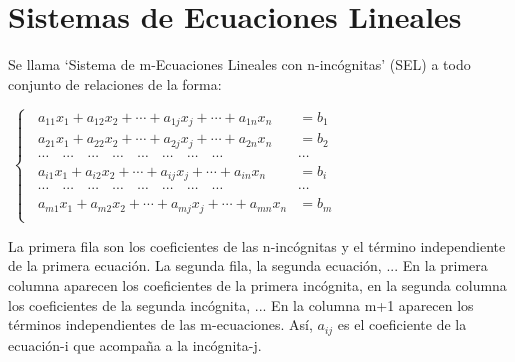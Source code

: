 \section[Sistemas de Ecuaciones Lineales]{Sistemas de Ecuaciones Lineales}

\begin{defi}
Se llama `Sistema de m-Ecuaciones Lineales con n-incógnitas' (SEL) a todo conjunto de relaciones de la forma:

\vspace{4mm}

\centerline{$\boxed{\; \begin{cases}
\;\; a_{11} x_1 + a_{12} x_2 + \cdots + a_{1j} x_j+ \cdots + a_{1n} x_n & = b_1\; \\
\;\; a_{21} x_1 + a_{22} x_2 + \cdots + a_{2j} x_j+ \cdots + a_{2n} x_n & = b_2\; \\
\;\; \cdots \quad \cdots \quad \cdots 	\quad \cdots \quad \cdots \quad \cdots \quad \cdots \quad \cdots & \cdots \\
\;\; a_{i1} x_1 + a_{i2} x_2 + \cdots + a_{ij} x_j+ \cdots + a_{in} x_n & = b_i\; \\
\;\; \cdots \quad \cdots \quad \cdots 	\quad \cdots \quad \cdots \quad \cdots \quad \cdots \quad \cdots & \cdots \\
\;\; a_{m1} x_1 + a_{m2} x_2 + \cdots + a_{mj} x_j+ \cdots + a_{mn} x_n & = b_m\; \\
\end{cases}}$}	
\end{defi}

\vspace{4mm} 

La primera fila son los coeficientes de las n-incógnitas y el término independiente de la primera ecuación. La segunda fila, la segunda ecuación, ... En la primera columna aparecen los coeficientes de la primera incógnita, en la segunda columna los coeficientes de la segunda incógnita, ... En la columna m+1 aparecen los términos independientes de las m-ecuaciones. Así, $a_{ij}$ es el coeficiente de la ecuación-i que acompaña a la incógnita-j.


